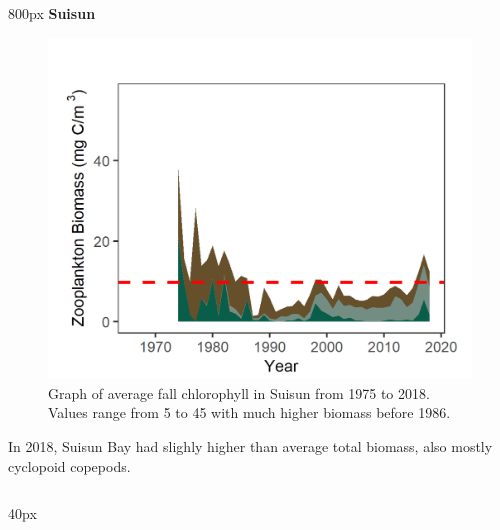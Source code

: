 \documentclass[
]{book}
\begin{document}
\begin{column}{800px\textwidth}
\textbf{Suisun}

\begin{figure}
\includegraphics[width=15.25in]{figures/zoops_ssfall} \caption{Graph of average fall chlorophyll in Suisun from 1975 to 2018. Values range from 5 to 45 with much higher biomass before 1986.}\label{fig:unnamed-chunk-116}
\end{figure}

In 2018, Suisun Bay had slighly higher than average total biomass, also mostly cyclopoid copepods.
\end{column}

\begin{column}{40px\textwidth}
~
\end{column}
\end{document}
